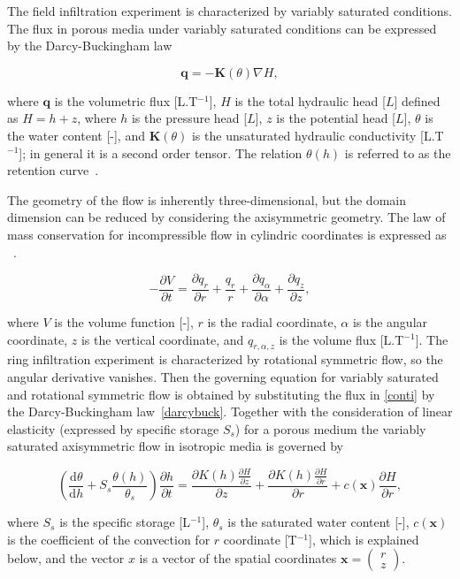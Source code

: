 \documentclass[review,times,3p,10pt]{elsarticle}
\newenvironment{lineq}
    {\begin{linenomath*}
    \begin{equation}
    }
    { 
    \end{equation} 
    \end{linenomath*}
    }
\newcommand{\dd}{\mathrm{d}}
\renewcommand{\vec}{\mathbf}
\begin{document}
The field infiltration experiment is characterized by variably saturated conditions. The flux in porous media under variably saturated conditions can be expressed by the Darcy-Buckingham law~\citep{buckingham} \begin{lineq}\label{darcybuck}\vec{q} = -\mathbf{K}(\theta) \nabla H,\end{lineq} where $\vec{q}$ is the volumetric flux [L.T$^{-1}$], $H$ is the total hydraulic head [$L$] defined as $H=h+z$, where $h$ is the pressure head [$L$], $z$ is the potential head [$L$], $\theta$ is the water content [-], and $\mathbf{K}(\theta)$ is the unsaturated hydraulic conductivity  [L.T$^{-1}$]; in general it is a  second order tensor. The relation $\theta(h)$ is referred to as the retention curve~\citep{vangenuchten}.

The geometry of the flow is inherently three-dimensional, but the domain dimension can be reduced by considering the axisymmetric geometry. The law of mass conservation  for incompressible flow in cylindric coordinates is expressed as ~\citep{bear1979}.
\begin{lineq}
\label{conti}
-\frac{\partial V}{\partial t} = \frac{\partial q_r}{\partial r} + \frac{q_r}{r} + \frac{\partial q_{\alpha}}{\partial \alpha} + \frac{\partial q_z}{\partial z} ,
\end{lineq}
where $V$ is the volume function [-],  $r$ is the radial coordinate, $\alpha$ is the angular coordinate,  $z$ is the vertical coordinate, and $q_{r, \alpha, z}$ is the  volume flux [L.T$^{-1}$]. The ring infiltration experiment is characterized by rotational symmetric flow, so the angular derivative vanishes. Then the governing equation for  variably saturated and rotational symmetric flow is obtained by substituting the flux in \eqref{conti} by the Darcy-Buckingham law~\eqref{darcybuck}. Together with the consideration of linear elasticity (expressed by specific storage $S_s$) for a porous medium the variably saturated axisymmetric flow in isotropic media is governed by
\begin{lineq}
\label{richaxi}
\left(\frac{\dd \theta}{\dd h} + S_s\frac{\theta(h)}{\theta_s} \right) \frac{\partial h}{\partial t}  =  \frac{\partial K(h) \frac{\partial H}{\partial z}}{\partial z} + \frac{\partial K(h) \frac{\partial H}{\partial r}}{\partial r} + c(\vec{x})\frac{\partial H}{\partial r},
\end{lineq}
where $S_s$ is the specific storage [L$^{-1}$], $\theta_s$ is the saturated water content [-],  $c(\vec{x})$ is the coefficient of the convection for $r$ coordinate [T$^{-1}$], which is explained below, and the vector $x$ is a vector of the spatial coordinates $\vec{x}=\left( \begin{smallmatrix} r \\ z \end{smallmatrix} \right)$.
\end{document}
